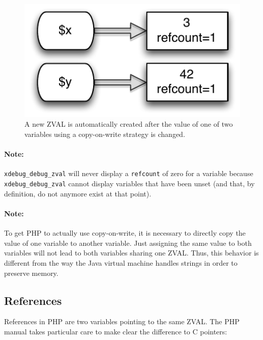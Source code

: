 \begin{figure}[!h]
  \begin{center}
    \includegraphics[scale=0.8]{images/x_3_y_42}
    \caption{A new ZVAL is automatically created after the value of one of two variables using a copy-on-write strategy is changed.}
    \label{fig:new-zval-after-copy-on-write}
  \end{center}
\end{figure}

\paragraph{Note:} \texttt{xdebug\_debug\_zval} will never display a \texttt{refcount} of zero for a variable because \texttt{xdebug\_debug\_zval} cannot display variables that have been unset (and that, by definition, do not anymore exist at that point).

\paragraph{Note:} To get PHP to actually use copy-on-write, it is necessary to directly copy the value of one variable to another variable. Just assigning the same value to both variables will not lead to both variables sharing one ZVAL. Thus, this behavior is different from the way the Java virtual machine handles strings in order to preserve memory.~\cite[chapter~2]{jvm-spec}


\subsection{References}
\label{sec:references}

References in PHP are two variables pointing to the same ZVAL. The PHP manual takes particular care to make clear the difference to C pointers:~\cite{php-manual-what-references-are}\cite{php-manual-what-references-are-not}

